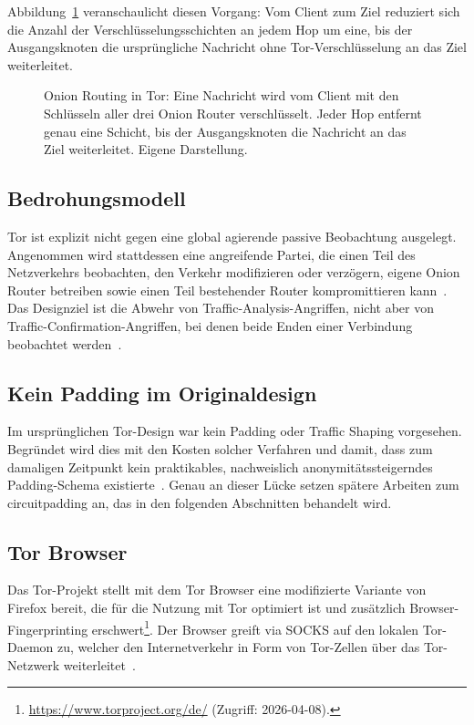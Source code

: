 Abbildung~\ref{fig:onion_routing} veranschaulicht diesen Vorgang: Vom Client zum Ziel reduziert sich die Anzahl der Verschlüsselungsschichten an jedem Hop um eine, bis der Ausgangsknoten die ursprüngliche Nachricht ohne Tor-Verschlüsselung an das Ziel weiterleitet.

\begin{figure}[H]
\centering
\resizebox{\textwidth}{!}{%
%
}
\caption{Onion Routing in Tor: Eine Nachricht wird vom Client mit den Schlüsseln aller drei Onion Router verschlüsselt. Jeder Hop entfernt genau eine Schicht, bis der Ausgangsknoten die Nachricht an das Ziel weiterleitet. Eigene Darstellung.}
\label{fig:onion_routing}
\end{figure}

\subsection{Bedrohungsmodell}
\label{sec:tor_bedrohungsmodell}

Tor ist explizit nicht gegen eine global agierende passive Beobachtung ausgelegt.
Angenommen wird stattdessen eine angreifende Partei, die einen Teil des Netzverkehrs beobachten, den Verkehr modifizieren oder verzögern, eigene Onion Router betreiben sowie einen Teil bestehender Router kompromittieren kann~\cite{dingledine2004tor}.
Das Designziel ist die Abwehr von Traffic-Analysis-Angriffen, nicht aber von Traffic-Confirmation-Angriffen, bei denen beide Enden einer Verbindung beobachtet werden~\cite{dingledine2004tor}.

\subsection{Kein Padding im Originaldesign}

Im ursprünglichen Tor-Design war kein Padding oder Traffic Shaping vorgesehen.
Begründet wird dies mit den Kosten solcher Verfahren und damit, dass zum damaligen Zeitpunkt kein praktikables, nachweislich anonymitätssteigerndes Padding-Schema existierte~\cite{dingledine2004tor}.
Genau an dieser Lücke setzen spätere Arbeiten zum \gls{circuitpadding} an, das in den folgenden Abschnitten behandelt wird.

\subsection{Tor Browser}

Das Tor-Projekt stellt mit dem Tor Browser eine modifizierte Variante von Firefox bereit, die für die Nutzung mit Tor optimiert ist und zusätzlich Browser-Fingerprinting erschwert\footnote{\url{https://www.torproject.org/de/} (Zugriff: 2026-04-08).}.
Der Browser greift via SOCKS auf den lokalen Tor-Daemon zu, welcher den Internetverkehr in Form von Tor-Zellen über das Tor-Netzwerk weiterleitet~\cite{jansen2023data}.

